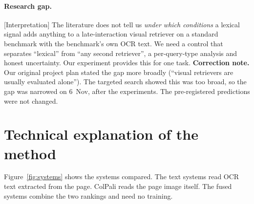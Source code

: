 \documentclass[11pt,a4paper]{article}
\newcommand{\lbl}[2]{\textsf{\scriptsize\textcolor{#1}{[#2]}}}
\newcommand{\Int}{\lbl{tagI}{Interpretation}}
\begin{document}
\paragraph{Research gap.}
\Int{} The literature does not tell us \emph{under which conditions} a lexical signal adds anything to a late-interaction visual retriever on a standard benchmark with the benchmark's own OCR text. We need a control that separates ``lexical'' from ``any second retriever'', a per-query-type analysis and honest uncertainty. Our experiment provides this for one task.
\textbf{Correction note.} Our original project plan stated the gap more broadly (``visual retrievers are usually evaluated alone''). The targeted search showed this was too broad, so the gap was narrowed on 6~Nov, after the experiments. The pre-registered predictions were not changed.

\section{Technical explanation of the method}
\label{sec:method}

Figure~\ref{fig:systems} shows the systems compared. The text systems read OCR text extracted from the page. ColPali reads the page image itself. The fused systems combine the two rankings and need no training.
\end{document}
